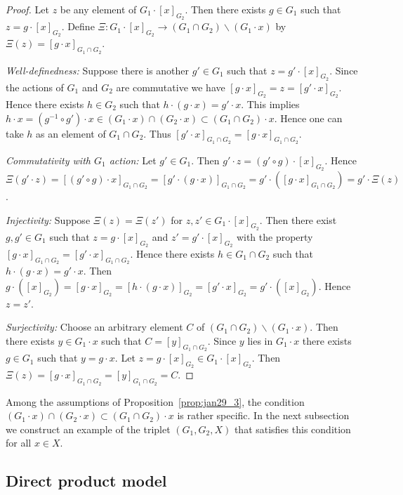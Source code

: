 \documentclass[11pt]{article}
\begin{document}
\begin{proof}
Let $z$ be any element of $G_1 \cdot [x]_{G_2}$.
Then there exists $g \in G_1$ such that $z = g \cdot [x]_{G_2}$.
Def\/ine $\varXi: G_1 \cdot [x]_{G_2} \rightarrow (G_1 \cap G_2) \backslash (G_1 \cdot x)$
by $\varXi (z) = [g \cdot x]_{G_1 \cap G_2}$.

\textit{Well-definedness:} Suppose there is another $g' \in G_1$ such that $z = g' \cdot  [x]_{G_2}$.
Since the actions of $G_1$ and $G_2$ are commutative we have
$[g \cdot x]_{G_2} =z = [g' \cdot x]_{G_2}$.
Hence there exists $h \in G_2$ such that $h \cdot (g \cdot x) = g' \cdot x$.
This implies $h \cdot x = (g^{-1} \circ g') \cdot x \in (G_1 \cdot x) \cap (G_2 \cdot x) \subset (G_1 \cap G_2) \cdot x$.
Hence one can take $h$ as an element of $G_1 \cap G_2$.
Thus $[g' \cdot x]_{G_1 \cap G_2} = [g \cdot x]_{G_1 \cap G_2}$.

\textit{Commutativity with $G_1$ action:}
Let $g' \in G_1$.
Then $g' \cdot z = (g' \circ g) \cdot [x]_{G_2}$.
Hence $\varXi(g' \cdot z) = [(g' \circ g) \cdot x]_{G_1 \cap G_2} =
[ g' \cdot (g \cdot x)]_{G_1 \cap G_2} =
g' \cdot ([g \cdot x]_{G_1 \cap G_2}) = g' \cdot \varXi (z)$.

\textit{Injectivity:} Suppose $\varXi (z) = \varXi (z')$ for $z,z' \in G_1 \cdot [x]_{G_2}$.
Then there exist $g, g' \in G_1$ such that $z = g \cdot [x]_{G_2}$ and $z' = g' \cdot [x]_{G_2}$
with the property $[g \cdot x]_{G_1 \cap G_2} = [g' \cdot x]_{G_1 \cap G_2}$.
Hence there exists $h \in G_1 \cap G_2$ such that $h \cdot (g \cdot x) = g' \cdot x$.
Then $g \cdot ([x]_{G_2}) = [g \cdot x]_{G_2} = [h \cdot (g \cdot x)]_{G_2} = [g' \cdot x]_{G_2} = g' \cdot ([x]_{G_2})$.
Hence $z=z'$.

\textit{Surjectivity:} Choose an arbitrary element $C$ of $(G_1 \cap G_2) \backslash (G_1 \cdot x)$.
Then there exists $y \in G_1 \cdot x$ such that $C = [y]_{G_1 \cap G_2}$.
Since $y$ lies in $G_1 \cdot x$ there exists $g \in G_1$ such that $y = g \cdot x$.
Let $z = g \cdot [x]_{G_2} \in G_1 \cdot [x]_{G_2}$.
Then $\varXi (z) = [g \cdot x]_{G_1 \cap G_2} = [y]_{G_1 \cap G_2} =C$.
\end{proof}

Among the assumptions of Proposition~\ref{prop:jan29_3}, the condition $(G_1 \cdot x) \cap (G_2 \cdot x) \subset (G_1 \cap G_2) \cdot x$
is rather specif\/ic.
In the next subsection we construct an example of the triplet $(G_1,G_2,X)$ that satisf\/ies this condition for all $x \in X$.


\subsection{Direct product model}\label{subsec:2_2}
\end{document}
